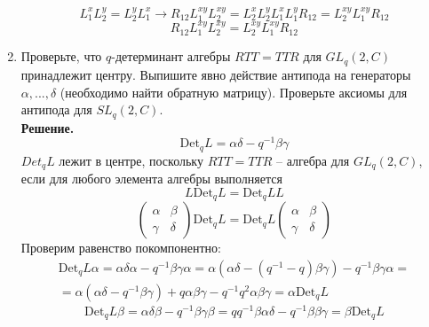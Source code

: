 \documentclass[12pt]{article}
\theoremstyle{definition}
\begin{document}
\begin{enumerate}
\begin{equation}
    \end{equation}
    \begin{equation}
        L^x_1L^y_2=L^y_2L^x_1\rightarrow R_{12}L_1^{xy}L_2^{xy}=L^x_2L^y_2L^x_1L^y_1R_{12}=L^{xy}_2L^{xy}_1R_{12}
    \end{equation}
    \begin{equation}
        \boxed{R_{12}L_1^{xy}L_2^{xy}=L^{xy}_2L^{xy}_1R_{12}}
    \end{equation}
    \item Проверьте, что $q$-детерминант алгебры $RTT=TTR$ для $GL_q(2,C)$ принадлежит центру. Выпишите явно действие антипода на генераторы $\alpha,...,\delta$ (необходимо найти обратную матрицу). Проверьте аксиомы для антипода для $SL_q(2,C)$.\\
    \textbf{Решение.}
    \begin{equation}
        \text{Det}_qL=\alpha\delta-q^{-1}\beta\gamma
    \end{equation}
    $Det_qL$ лежит в центре, поскольку $RTT=TTR$ -- алгебра для $GL_q(2,C)$, если для любого элемента алгебры выполняется
    \begin{equation}
        L\text{Det}_qL=\text{Det}_qLL
    \end{equation}
    \begin{equation}
        \begin{pmatrix}
            \alpha & \beta\\
            \gamma & \delta
        \end{pmatrix}\text{Det}_qL=\text{Det}_qL\begin{pmatrix}
            \alpha & \beta\\
            \gamma & \delta
        \end{pmatrix}
    \end{equation}
    Проверим равенство покомпонентно:
    \begin{multline}
        \text{Det}_qL\alpha=\alpha\delta\alpha-q^{-1}\beta\gamma\alpha=\alpha(\alpha\delta-(q^{-1}-q)\beta\gamma)-q^{-1}\beta\gamma\alpha=\\=\alpha(\alpha\delta-q^{-1}\beta\gamma)+q\alpha\beta\gamma-q^{-1}q^2\alpha\beta\gamma=\alpha\text{Det}_qL
    \end{multline}
    \begin{equation}
        \text{Det}_qL\beta=\alpha\delta\beta-q^{-1}\beta\gamma\beta=qq^{-1}\beta\alpha\delta-q^{-1}\beta\beta\gamma=\beta\text{Det}_qL
    \end{equation}
    \begin{equation}

\end{equation}
\end{enumerate}
\end{document}
